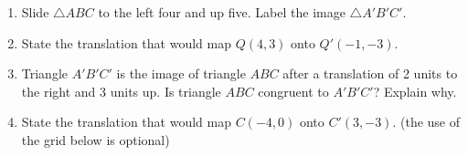 \documentclass[12pt, twoside]{article}
\begin{document}
\begin{enumerate}
\newpage
\item Slide $\triangle ABC$ to the left four and up five. Label the image $\triangle A'B'C'$.
  \begin{center}
  \end{center}
 
\item State the translation that would map $Q(4,3)$ onto $Q'(-1,-3)$. \vspace{2cm}

\item Triangle $A'B'C'$ is the image of triangle $ABC$ after a translation of 2 units to the right and 3 units up. Is triangle $ABC$ congruent to $A'B'C'$? Explain why. \vspace{3cm}
 
\item State the translation that would map $C(-4,0)$ onto $C'(3,-3)$. (the use of the grid below is optional)
\begin{center}
\end{center}


\end{enumerate}
\end{document}
